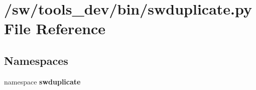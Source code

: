 \section{/sw/tools\_\-dev/bin/swduplicate.py File Reference}
\label{swduplicate_8py}
\subsection*{Namespaces}
\begin{CompactItemize}
\item 
namespace {\bf swduplicate}
\end{CompactItemize}
